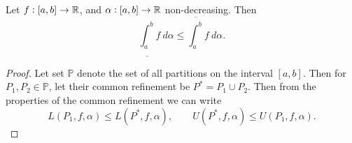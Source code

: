 \begin{proposition}
	Let $f:[a,b] \to \mathbb{R}$, and $\alpha:[a,b] \to \mathbb{R}$ non-decreasing.
	Then 
	\[ \underline{\int_a^b} f\ d\alpha \leq \overline{\int_a^b} f\ d\alpha. \]
\end{proposition}
\begin{proof}
	
	Let set $\mathbb{P}$ denote the set of all partitions on the interval $[a,b]$. Then for $P_1, P_2 \in \mathbb{P}$, let their common refinement be $P^* = P_1 \cup P_2$. Then from the properties of the common refinement we can write
	\[  L(P_1,f,\alpha) \leq L(P^*,f, \alpha), \qquad U(P^*, f,\alpha) \leq U(P_1, f, \alpha). \]
	\[  \]
\end{proof}



